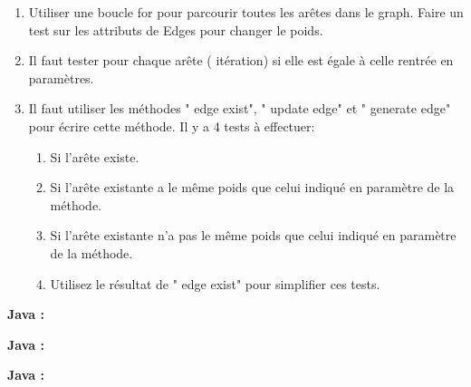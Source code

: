 \begin{Exercice}[20 minutes]
    \begin{conseil}
    \begin{enumerate}
    \item Utiliser une boucle for pour parcourir toutes les arêtes dans le graph. Faire un test sur les attributs de Edges pour changer le poids.
    \item Il faut tester pour chaque arête ( itération) si elle  est égale à celle rentrée en paramètres.
    \item Il faut utiliser les méthodes " edge exist", " update edge" et " generate edge" pour écrire cette méthode. Il y a 4 tests à effectuer: 
        \begin{enumerate}
        \item Si l'arête existe.
        \item Si l'arête existante a le même poids que celui indiqué en paramètre de la méthode.
        \item Si l'arête existante n'a pas le même poids que celui indiqué en paramètre de la méthode.
        \item Utilisez le résultat de " edge exist" pour simplifier ces tests.
        \end{enumerate}
    \end{enumerate}
    \end{conseil}
    \begin{solution}
    \textbf{Java :}
         
    \end{solution}
    \begin{solution}
    \textbf{Java :}
         
    \end{solution}
    \begin{solution}
    \textbf{Java :}
         
    \end{solution}

\end{Exercice}





